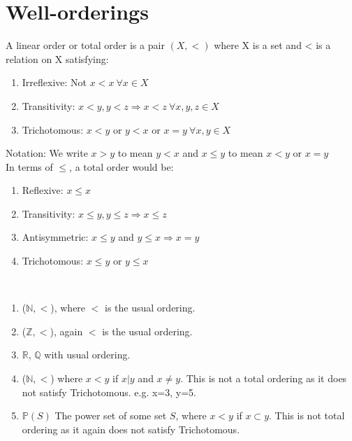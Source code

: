 \section{Well-orderings}
\begin{definition} A linear order or total order is a pair $(X,<)$
where X is a set and < is a relation on X satisfying:
\begin{enumerate}
\item Irreflexive: Not $x<x ~\forall x \in X$\\
\item Transitivity: $x<y, y<z \Rightarrow x<z ~\forall x, y, z \in X$\\
\item Trichotomous: $x<y$ or $y<x$ or $x=y ~\forall x, y \in X$
\end{enumerate}
\end{definition}
Notation: We write $x>y$ to mean $y<x$ and $x \le y$ to mean $x<y$ or $x=y$\\
In terms of $\le$, a total order would be:\\
\begin{enumerate}
\item Reflexive: $x \le x$\\
\item Transitivity: $x \le y, y \le z \Rightarrow x \le z$\\
\item Antisymmetric: $x \le y$ and $y \le x \Rightarrow x=y$
\item Trichotomous: $x \le y$ or $y \le x$
\end{enumerate}
\begin{example}
~\\
\begin{enumerate}
\item ($\mathbb{N},<$), where $<$ is the usual ordering.\\
\item ($\mathbb{Z},<$), again $<$ is the usual ordering.\\
\item $\mathbb{R}$, $\mathbb{Q}$ with usual ordering.\\
\item ($\mathbb{N},<$) where $x<y$ if $x|y$ and $x \neq y$.
This is not a total ordering as it does not satisfy Trichotomous. e.g. x=3, y=5.\\
\item $\mathbb{P}(S)$ The power set of some set $S$, where $x<y$
if $x \subset y$. This is not total ordering as it again does not
satisfy Trichotomous.
\end{enumerate}
\end{example}
